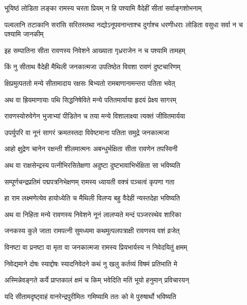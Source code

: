 \twolineshloka
{भूयिष्ठं लोडिता लङ्का रामस्य चरता प्रियम्}
{न हि पश्यामि वैदेहीं सीतां सर्वाङ्गशोभनाम्} %

\threelineshloka
{पल्वलानि तटाकानि सरांसि सरितस्तथा}
{नद्योऽनूपवनान्ताश्च दुर्गाश्च धरणीधराः}
{लोडिता वसुधा सर्वा न च पश्यामि जानकीम्} %

\twolineshloka
{इह सम्पातिना सीता रावणस्य निवेशने}
{आख्याता गृध्रराजेन न च पश्यामि तामहम्} %

\twolineshloka
{किं नु सीताथ वैदेही मैथिली जनकात्मजा}
{उपतिष्ठेत विवशा रावणं दुष्टचारिणम्} %

\twolineshloka
{क्षिप्रमुत्पततो मन्ये सीतामादाय रक्षसः}
{बिभ्यतो रामबाणानामन्तरा पतिता भवेत्} %

\twolineshloka
{अथ वा ह्रियमाणायाः पथि सिद्धनिषेविते}
{मन्ये पतितमार्याया हृदयं प्रेक्ष्य सागरम्} %

\twolineshloka
{रावणस्योरुवेगेन भुजाभ्यां पीडितेन च}
{तया मन्ये विशालाक्ष्या त्यक्तं जीवितमार्यया} %

\twolineshloka
{उपर्युपरि वा नूनं सागरं क्रमतस्तदा}
{विवेष्टमाना पतिता समुद्रे जनकात्मजा} %

\twolineshloka
{आहो क्षुद्रेण चानेन रक्षन्ती शीलमात्मनः}
{अबन्धुर्भक्षिता सीता रावणेन तपस्विनी} %

\twolineshloka
{अथ वा राक्षसेन्द्रस्य पत्नीभिरसितेक्षणा}
{अदुष्टा दुष्टभावाभिर्भक्षिता सा भविष्यति} %

\twolineshloka
{सम्पूर्णचन्द्रप्रतिमं पद्मपत्रनिभेक्षणम्}
{रामस्य ध्यायती वक्त्रं पञ्चत्वं कृपणा गता} %

\twolineshloka
{हा राम लक्ष्मणेत्येव हायोध्येति च मैथिली}
{विलप्य बहु वैदेही न्यस्तदेहा भविष्यति} %

\twolineshloka
{अथ वा निहिता मन्ये रावणस्य निवेशने}
{नूनं लालप्यते मन्दं पञ्जरस्थेव शारिका} %

\twolineshloka
{जनकस्य कुले जाता रामपत्नी सुमध्यमा}
{कथमुत्पलपत्राक्षी रावणस्य वशं व्रजेत्} %

\twolineshloka
{विनष्टा वा प्रनष्टा वा मृता वा जनकात्मजा}
{रामस्य प्रियभार्यस्य न निवेदयितुं क्षमम्} %

\twolineshloka
{निवेद्यमाने दोषः स्याद्दोषः स्यादनिवेदने}
{कथं नु खलु कर्तव्यं विषमं प्रतिभाति मे} %

\twolineshloka
{अस्मिन्नेवङ्गते कर्ये प्राप्तकालं क्षमं च किम्}
{भवेदिति मतिं भूयो हनुमान् प्रविचारयन्} %

\twolineshloka
{यदि सीतामदृष्ट्वाहं वानरेन्द्रपुरीमितः}
{गमिष्यामि ततः को मे पुरुषार्थो भविष्यति} %


